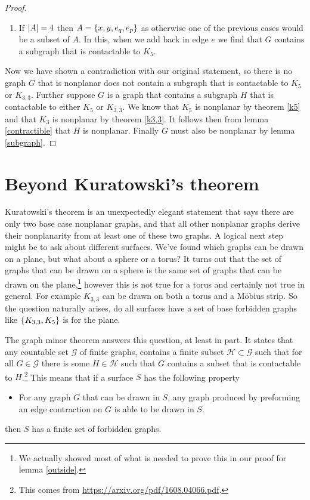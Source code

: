\documentclass{article}
\begin{document}
\begin{proof}
\begin{enumerate}
		\item If $\left| {A} \right| = 4$ then $A = \left\{ {x,y,e_q,e_p} \right\}$ as otherwise one of the previous cases would be a subset of $A$. In this, when we add back in edge $e$ we find that $G$ contains a subgraph that is contactable to $K_5$.
	\end{enumerate}

	Now we have shown a contradiction with our original statement, so there is no graph $G$ that is nonplanar does not contain a subgraph that is contactable to $K_5$ or $K_{3,3}$. Further suppose $G$ is a graph that contains a subgraph $H$ that is contactable to either $K_5$ or $K_{3,3}$. We know that $K_5$ is nonplanar by theorem \ref{k5} and that $K_3$ is nonplanar by theorem \ref{k3,3}. It follows then from lemma \ref{contractible} that $H$ is nonplanar. Finally $G$ must also be nonplanar by lemma \ref{subgraph}.
\end{proof}

\section{Beyond Kuratowski's theorem} \label{Extension}
Kuratowski's theorem is an unexpectedly elegant statement that says there are only two base case nonplanar graphs, and that all other nonplanar graphs derive their nonplanarity from at least one of these two graphs. A logical next step might be to ask about different surfaces. We've found which graphs can be drawn on a plane, but what about a sphere or a torus? It turns out that the set of graphs that can be drawn on a sphere is the same set of graphs that can be drawn on the plane,\footnote{We actually showed most of what is needed to prove this in our proof for lemma \ref{outside}.} however this is not true for a torus and certainly not true in general. For example $K_{3,3}$ can be drawn on both a torus and a M\"obius strip. So the question naturally arises, do all surfaces have a set of base forbidden graphs like $\left\{ {K_{3,3},K_5} \right\}$ is for the plane.

The graph minor theorem answers this question, at least in part. It states that any countable set $\mathcal G$ of finite graphs, contains a finite subset $\mathcal H\subset\mathcal G$ such that for all $G\in\mathcal G$ there is some $H\in\mathcal H$ such that $G$ contains a subset that is contactable to $H$.\footnote{This comes from \url{https://arxiv.org/pdf/1608.04066.pdf}.}
This means that if a surface $S$ has the following property
\begin{itemize}
	\item For any graph $G$ that can be drawn in $S$, any graph produced by preforming an edge contraction on $G$ is able to be drawn in $S$.
\end{itemize}
then $S$ has a finite set of forbidden graphs.
\end{document}
